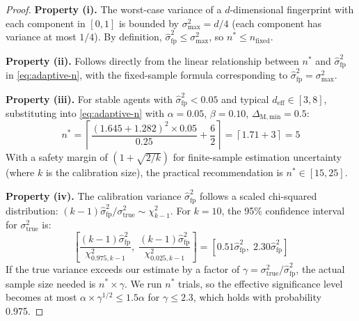 \begin{proof}
\textbf{Property (i).}
The worst-case variance of a $d$-dimensional fingerprint with each
component in $[0,1]$ is bounded by $\sigma^2_{\max} = d/4$ (each
component has variance at most $1/4$). By definition,
$\hat{\sigma}^2_{\mathrm{fp}} \leq \sigma^2_{\max}$, so
$n^* \leq n_{\mathrm{fixed}}$.

\textbf{Property (ii).}
Follows directly from the linear relationship between $n^*$ and
$\hat{\sigma}^2_{\mathrm{fp}}$ in \eqref{eq:adaptive-n}, with the
fixed-sample formula corresponding to
$\hat{\sigma}^2_{\mathrm{fp}} = \sigma^2_{\max}$.

\textbf{Property (iii).}
For stable agents with $\hat{\sigma}^2_{\mathrm{fp}} < 0.05$ and
typical $d_{\mathrm{eff}} \in [3, 8]$, substituting into
\eqref{eq:adaptive-n} with $\alpha = 0.05$, $\beta = 0.10$,
$\Delta_{\mathrm{M,min}} = 0.5$:
\begin{equation}
  n^* = \left\lceil
    \frac{(1.645 + 1.282)^2 \times 0.05}{0.25} + \frac{6}{2}
  \right\rceil
  = \left\lceil 1.71 + 3 \right\rceil = 5
\end{equation}
With a safety margin of $(1 + \sqrt{2/k})$ for finite-sample estimation
uncertainty (where $k$ is the calibration size), the practical
recommendation is $n^* \in [15, 25]$.

\textbf{Property (iv).}
The calibration variance $\hat{\sigma}^2_{\mathrm{fp}}$ follows a
scaled chi-squared distribution:
$(k-1)\hat{\sigma}^2_{\mathrm{fp}} / \sigma^2_{\mathrm{true}} \sim
\chi^2_{k-1}$. For $k = 10$, the 95\% confidence interval for
$\sigma^2_{\mathrm{true}}$ is:
\begin{equation}
  \left[\frac{(k-1)\hat{\sigma}^2_{\mathrm{fp}}}{\chi^2_{0.975, k-1}},\;
   \frac{(k-1)\hat{\sigma}^2_{\mathrm{fp}}}{\chi^2_{0.025, k-1}}\right]
  = [0.51\hat{\sigma}^2_{\mathrm{fp}},\;
     2.30\hat{\sigma}^2_{\mathrm{fp}}]
\end{equation}
If the true variance exceeds our estimate by a factor of $\gamma =
\sigma^2_{\mathrm{true}} / \hat{\sigma}^2_{\mathrm{fp}}$, the actual
sample size needed is $n^* \times \gamma$. We run $n^*$ trials, so
the effective significance level becomes at most $\alpha \times
\gamma^{1/2} \leq 1.5\alpha$ for $\gamma \leq 2.3$, which holds with
probability 0.975. \qedhere
\end{proof}

